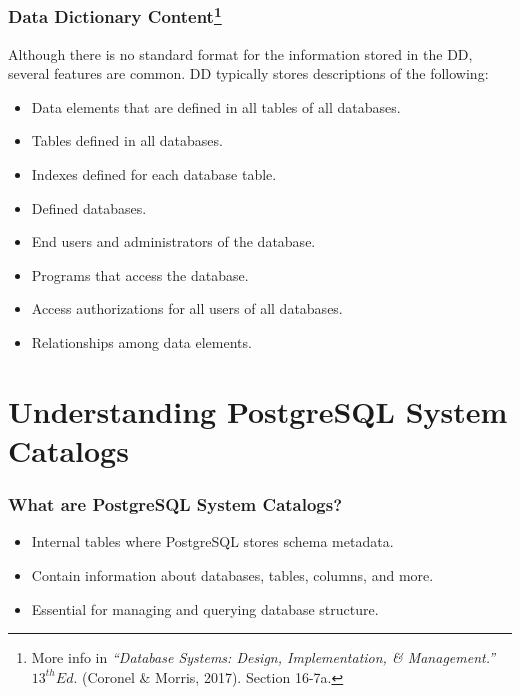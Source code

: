 \documentclass{beamer}
\begin{document}
\begin{frame}
    \frametitle{Data Dictionary Content\footnote{More info in \textit{``Database Systems: Design, Implementation, \& Management.''} $13^{th} Ed.$ (Coronel \& Morris, 2017). Section 16-7a.}}
    Although there is no standard format for the information stored in the DD, several features are common. DD typically stores descriptions of the following:
    \begin{itemize}
        \item Data elements that are defined in all tables of all databases.\pause
        \item Tables defined in all databases.\pause
        \item Indexes defined for each database table.\pause
        \item Defined databases.\pause
        \item End users and administrators of the database.\pause
        \item Programs that access the database.\pause
        \item Access authorizations for all users of all databases.\pause
        \item Relationships among data elements.\pause
    \end{itemize}
\end{frame}


\section{Understanding PostgreSQL System Catalogs}

\begin{frame}
    \frametitle{What are PostgreSQL System Catalogs?}
    \begin{itemize}
        \item Internal tables where PostgreSQL stores schema metadata.
        \item Contain information about databases, tables, columns, and more.
        \item Essential for managing and querying database structure.
    \end{itemize}
\end{frame}
\end{document}

